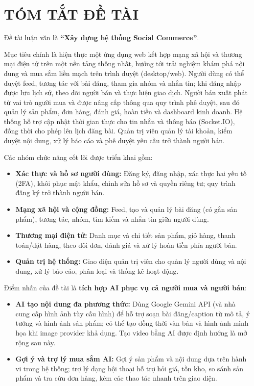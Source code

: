 \section*{TÓM TẮT ĐỀ TÀI}
\thispagestyle{empty}

\vspace{0.5cm}

Đề tài luận văn là \textbf{``Xây dựng hệ thống Social Commerce''}.

Mục tiêu chính là hiện thực một ứng dụng web kết hợp mạng xã hội và thương mại điện tử trên một nền tảng thống nhất, hướng tới trải nghiệm khám phá nội dung và mua sắm liền mạch trên trình duyệt (desktop/web). Người dùng có thể duyệt feed, tương tác với bài đăng, tham gia nhóm và nhắn tin; khi đăng nhập được lưu lịch sử, theo dõi người bán và thực hiện giao dịch. Người bán xuất phát từ vai trò người mua và được nâng cấp thông qua quy trình phê duyệt, sau đó quản lý sản phẩm, đơn hàng, đánh giá, hoàn tiền và dashboard kinh doanh. Hệ thống hỗ trợ cập nhật thời gian thực cho tin nhắn và thông báo (Socket.IO), đồng thời cho phép lên lịch đăng bài. Quản trị viên quản lý tài khoản, kiểm duyệt nội dung, xử lý báo cáo và phê duyệt yêu cầu trở thành người bán.

Các nhóm chức năng cốt lõi được triển khai gồm:
\begin{itemize}
    \item \textbf{Xác thực và hồ sơ người dùng:} Đăng ký, đăng nhập, xác thực hai yếu tố (2FA), khôi phục mật khẩu, chỉnh sửa hồ sơ và quyền riêng tư; quy trình đăng ký trở thành người bán.
    \item \textbf{Mạng xã hội và cộng đồng:} Feed, tạo và quản lý bài đăng (có gắn sản phẩm), tương tác, nhóm, tìm kiếm và nhắn tin giữa người dùng.
    \item \textbf{Thương mại điện tử:} Danh mục và chi tiết sản phẩm, giỏ hàng, thanh toán/đặt hàng, theo dõi đơn, đánh giá và xử lý hoàn tiền phía người bán.
    \item \textbf{Quản trị hệ thống:} Giao diện quản trị viên cho quản lý người dùng và nội dung, xử lý báo cáo, phân loại và thống kê hoạt động.
\end{itemize}

Điểm nhấn của đề tài là \textbf{tích hợp AI phục vụ cả người mua và người bán}:
\begin{itemize}
    \item \textbf{AI tạo nội dung đa phương thức:} Dùng Google Gemini API (và nhà cung cấp hình ảnh tùy cấu hình) để hỗ trợ soạn bài đăng/caption từ mô tả, ý tưởng và hình ảnh sản phẩm; có thể tạo đồng thời văn bản và hình ảnh minh họa khi image provider khả dụng. Tạo video bằng AI được định hướng là mở rộng sau này.
    \item \textbf{Gợi ý và trợ lý mua sắm AI:} Gợi ý sản phẩm và nội dung dựa trên hành vi trong hệ thống; trợ lý dạng hội thoại hỗ trợ hỏi giá, tồn kho, so sánh sản phẩm và tra cứu đơn hàng, kèm các thao tác nhanh trên giao diện.
\end{itemize}

\clearpage
